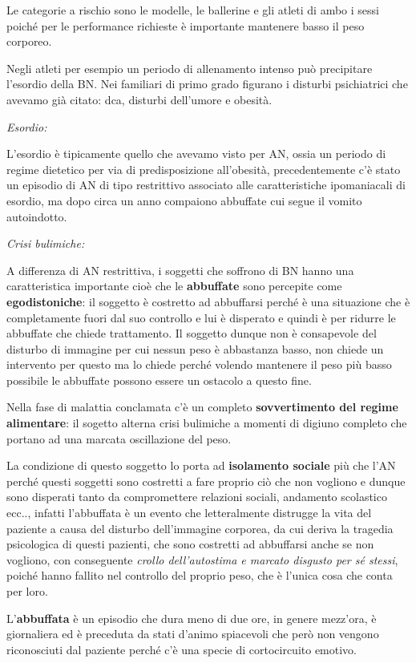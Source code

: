 Le categorie a rischio sono le modelle, le ballerine e gli atleti di
ambo i sessi poiché per le performance richieste è importante mantenere
basso il peso corporeo.

Negli atleti per esempio un periodo di allenamento intenso può
precipitare l'esordio della BN. Nei familiari di primo grado figurano i
disturbi psichiatrici che avevamo già citato: dca, disturbi dell'umore e
obesità.

\emph{\emph{Esordio:}}

L'esordio è tipicamente quello che avevamo visto per AN, ossia un
periodo di regime dietetico per via di predisposizione all'obesità,
precedentemente c'è stato un episodio di AN di tipo restrittivo
associato alle caratteristiche ipomaniacali di esordio, ma dopo circa un
anno compaiono abbuffate cui segue il vomito autoindotto.

\emph{\emph{Crisi bulimiche:}}

A differenza di AN restrittiva, i soggetti che soffrono di BN hanno una
caratteristica importante cioè che le \textbf{abbuffate} sono percepite
come \textbf{egodistoniche}: il soggetto è costretto ad abbuffarsi
perché è una situazione che è completamente fuori dal suo controllo e
lui è disperato e quindi è per ridurre le abbuffate che chiede
trattamento. Il soggetto dunque non è consapevole del disturbo di
immagine per cui nessun peso è abbastanza basso, non chiede un
intervento per questo ma lo chiede perché volendo mantenere il peso più
basso possibile le abbuffate possono essere un ostacolo a questo fine.

Nella fase di malattia conclamata c'è un completo \textbf{sovvertimento
del regime alimentare}: il sogetto alterna crisi bulimiche a momenti di
digiuno completo che portano ad una marcata oscillazione del peso.

La condizione di questo soggetto lo porta ad \textbf{isolamento sociale}
più che l'AN perché questi soggetti sono costretti a fare proprio ciò
che non vogliono e dunque sono disperati tanto da compromettere
relazioni sociali, andamento scolastico ecc.., infatti l'abbuffata è un
evento che letteralmente distrugge la vita del paziente a causa del
disturbo dell'immagine corporea, da cui deriva la tragedia psicologica
di questi pazienti, che sono costretti ad abbuffarsi anche se non
vogliono, con conseguente \emph{crollo dell'autostima e marcato disgusto
per sé stessi}, poiché hanno fallito nel controllo del proprio peso, che
è l'unica cosa che conta per loro.

L'\textbf{abbuffata} è un episodio che dura meno di due ore, in genere
mezz'ora, è giornaliera ed è preceduta da stati d'animo spiacevoli che
però non vengono riconosciuti dal paziente perché c'è una specie di
cortocircuito emotivo.

